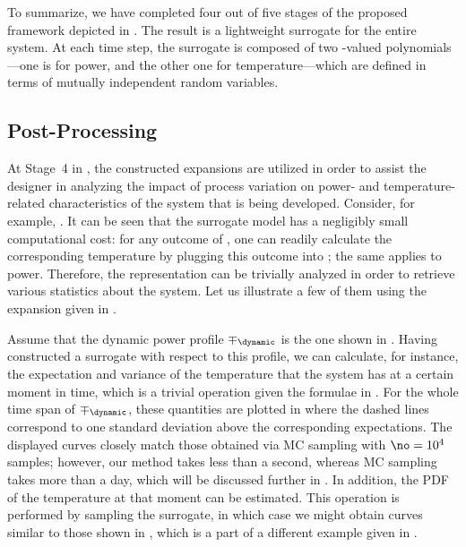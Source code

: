 To summarize, we have completed four out of five stages of the proposed
framework depicted in . The result is a lightweight
surrogate for the entire system. At each time step, the surrogate is composed of
two \np-valued polynomials---one is for power, and the other one for
temperature---which are defined in terms of \nz mutually independent random
variables.

\subsection{Post-Processing}

At Stage~4 in , the constructed expansions are utilized in
order to assist the designer in analyzing the impact of process variation on
power- and temperature-related characteristics of the system that is being
developed. Consider, for example, . It can be seen
that the surrogate model has a negligibly small computational cost: for any
outcome of \vz, one can readily calculate the corresponding temperature by
plugging this outcome into ; the same applies to
power. Therefore, the representation can be trivially analyzed in order to
retrieve various statistics about the system. Let us illustrate a few of them
using the expansion given in .

Assume that the dynamic power profile $\mp_\dynamic$ is the one shown in
. Having constructed a surrogate with respect to
this profile, we can calculate, for instance, the expectation and variance of
the temperature that the system has at a certain moment in time, which is a
trivial operation given the formulae in . For the whole time
span of $\mp_\dynamic$, these quantities are plotted in
 where the dashed lines correspond to one
standard deviation above the corresponding expectations. The displayed curves
closely match those obtained via \ac{MC} sampling with $\no = 10^4$ samples;
however, our method takes less than a second, whereas \ac{MC} sampling takes
more than a day, which will be discussed further in
. In addition, the \ac{PDF} of the temperature at
that moment can be estimated. This operation is performed by sampling the
surrogate, in which case we might obtain curves similar to those shown in
, which is a part of a different example given
in .
